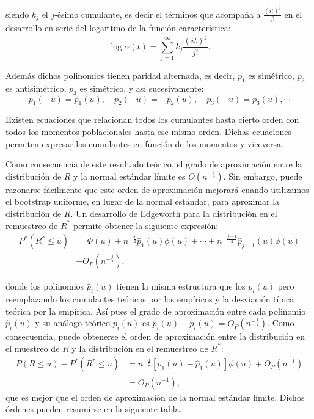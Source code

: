 \documentclass[]{book}
\theoremstyle{definition}
\theoremstyle{definition}
\theoremstyle{definition}
\theoremstyle{remark}
\begin{document}
siendo \(k_j\) el \(j\)-ésimo cumulante, es decir el términos que
acompaña a \(\frac{\left( it \right)^{j}}{j!}\) en el desarrollo en
serie del logaritmo de la función característica:
\[\log \alpha \left( t \right) =\sum_{j=1}^{\infty }k_j\frac{\left( it \right)
^{j}}{j!}.\]

Además dichos polinomios tienen paridad alternada, es decir, \(p_1\) es
simétrico, \(p_2\) es antisimétrico, \(p_3\) es simétrico, y así
sucesivamente:
\[p_1\left( -u \right) = p_1\left( u \right),\quad p_2\left( -u \right)
= -p_2\left( u \right),\quad p_3\left( -u \right) = p_3\left( u \right)
,\cdots\]

Existen ecuaciones que relacionan todos los cumulantes hasta cierto
orden con todos los momentos poblacionales hasta ese mismo orden. Dichas
ecuaciones permiten expresar los cumulantes en función de los momentos y
viceversa.

Como consecuencia de este resultado teórico, el grado de aproximación
entre la distribución de \(R\) y la normal estándar límite es
\(O\left( n^{-\frac{1}{2}} \right)\). Sin embargo, puede razonarse
fácilmente que este orden de aproximación mejorará cuando utilizamos el
bootstrap uniforme, en lugar de la normal estándar, para aproximar la
distribución de \(R\). Un desarrollo de Edgeworth para la distribución
en el remuestreo de \(R^{\ast}\) permite obtener la siguiente expresión:
\[\begin{aligned}
P^{\ast}\left( R^{\ast}\leq u \right) &= \Phi \left( u \right) +n^{-\frac{1}{2}
}\hat{p}_1\left( u \right) \phi \left( u \right) +\cdots +n^{-\frac{j-1}{2}}
\hat{p}_{j-1}\left( u \right) \phi \left( u \right) \\
&+ O_{P}\left( n^{-\frac{j}{2}} \right),
\end{aligned}\]

donde los polinomios \(\hat{p}_i\left( u \right)\) tienen la misma
estructura que los \(p_i\left( u \right)\) pero reemplazando los
cumulantes teóricos por los empíricos y la desviación típica teórica por
la empírica. Así pues el grado de aproximación entre cada polinomio
\(\hat{p}_i\left( u \right)\) y su análogo teórico
\(p_i\left( u \right)\) es
\(\hat{p}_i\left( u \right) -p_i\left( u \right) =O_{P}\left( n^{-\frac{1}{2}} \right)\).
Como consecuencia, puede obtenerse el orden de aproximación entre la
distribución en el muestreo de \(R\) y la distribución en el remuestreo
de \(R^{\ast}\): \[\begin{aligned}
P\left( R\leq u \right) -P^{\ast}\left( R^{\ast}\leq u \right) &=  n^{-\frac{1}{
2}}\left[ p_1\left( u \right) -\hat{p}_1\left( u \right) \right] \phi
\left( u \right) +O_{P}\left( n^{-1} \right) \\
&=  O_{P}\left( n^{-1} \right),\end{aligned}\]que es mejor que el orden
de aproximación de la normal estándar límite. Dichos órdenes pueden
resumirse en la siguiente tabla.
\end{document}
